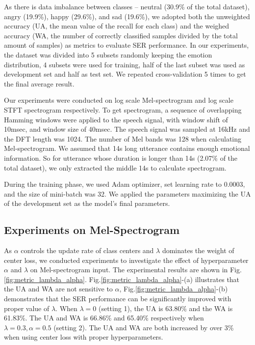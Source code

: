 \documentclass{article}
\begin{document}
As there is data imbalance between classes -- neutral (30.9\% of the total dataset), angry (19.9\%), happy (29.6\%), and sad (19.6\%), we adopted both the unweighted accuracy ({UA}, the mean value of the recall for each class) and the weighed accuracy ({WA},  the number of correctly classified samples divided by the total amount of samples) as metrics to evaluate SER performance.  In our experiments, the dataset was divided into 5 subsets randomly keeping the emotion distribution, 4 subsets were used for training, half of the last subset was used as development set and half as test set. We repeated cross-validation  5 times to get the final average result.

Our experiments were conducted on log scale Mel-spectrogram and log scale STFT spectrogram respectively. To get spectrogram, a sequence of overlapping Hamming windows were applied to the speech signal, with window shift of 10msec, and window size of 40msec. The speech signal was sampled at 16kHz and the DFT length was 1024. The number of Mel bands was 128 when calculating Mel-spectrogram. We assumed that 14s long utterance contains enough emotional information. So for utterance whose duration is longer than 14s (2.07\% of the total dataset), we only extracted the middle 14s to calculate spectrogram. 

During the training phase, we used Adam \cite{kingma2014adam} optimizer, set learning rate to 0.0003, and the size of mini-batch was 32. We applied the parameters maximizing the UA of the development set as the model's final parameters.


\subsection{Experiments on Mel-Spectrogram}

As $\alpha$ controls the update rate of class centers and $\lambda$ dominates the weight of center loss, we conducted experiments to investigate the effect of hyperparameter $\alpha$ and $\lambda$ on Mel-spectrogram input. The  experimental results are shown in Fig.\ref{fig:metric_lambda_alpha}. Fig.\ref{fig:metric_lambda_alpha}-(a) illustrates that the UA and WA  are not sensitive to $\alpha$, Fig.\ref{fig:metric_lambda_alpha}-(b) demonstrates that the SER performance can be significantly improved with proper value of $\lambda$. When $\lambda=0$ ({setting 1}), the UA is 63.80\% and the WA is 61.83\%. The UA and WA is 66.86\% and 65.40\% respectively when $\lambda=0.3, \alpha=0.5$ ({setting 2}). The UA and WA are both increased by over 3\% when using center loss with proper hyperparameters.
\end{document}
